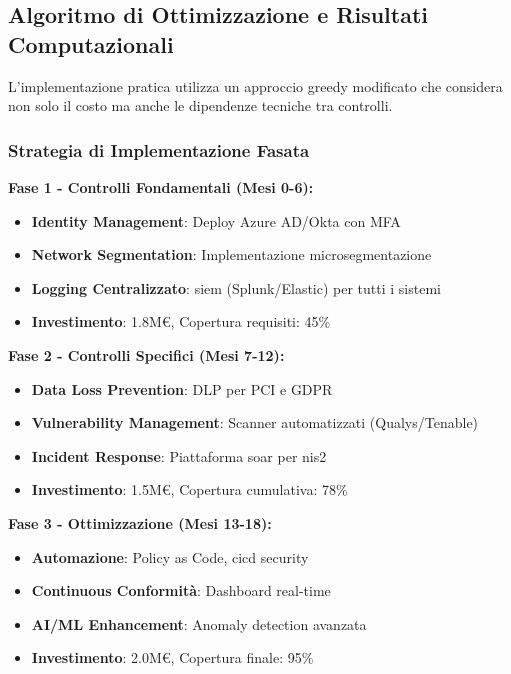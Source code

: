 \subsection{Algoritmo di Ottimizzazione e Risultati Computazionali}

L'implementazione pratica utilizza un approccio greedy modificato che considera non solo il costo ma anche le dipendenze tecniche tra controlli\autocite{Chvatal1979}.

\subsubsection{Strategia di Implementazione Fasata}

\textbf{Fase 1 - Controlli Fondamentali (Mesi 0-6):}
\begin{itemize}
    \item \textbf{Identity Management}: Deploy Azure AD/Okta con MFA
    \item \textbf{Network Segmentation}: Implementazione microsegmentazione
    \item \textbf{Logging Centralizzato}: \gls{siem} (Splunk/Elastic) per tutti i sistemi
    \item \textbf{Investimento}: 1.8M€, Copertura requisiti: 45\%
\end{itemize}

\textbf{Fase 2 - Controlli Specifici (Mesi 7-12):}
\begin{itemize}
    \item \textbf{Data Loss Prevention}: DLP per PCI e GDPR
    \item \textbf{Vulnerability Management}: Scanner automatizzati (Qualys/Tenable)
    \item \textbf{Incident Response}: Piattaforma \gls{soar} per \gls{nis2}
    \item \textbf{Investimento}: 1.5M€, Copertura cumulativa: 78\%
\end{itemize}

\textbf{Fase 3 - Ottimizzazione (Mesi 13-18):}
\begin{itemize}
    \item \textbf{Automazione}: Policy as Code, \gls{cicd} security
    \item \textbf{Continuous Conformità}: Dashboard real-time
    \item \textbf{AI/ML Enhancement}: Anomaly detection avanzata
    \item \textbf{Investimento}: 2.0M€, Copertura finale: 95\%
\end{itemize}

